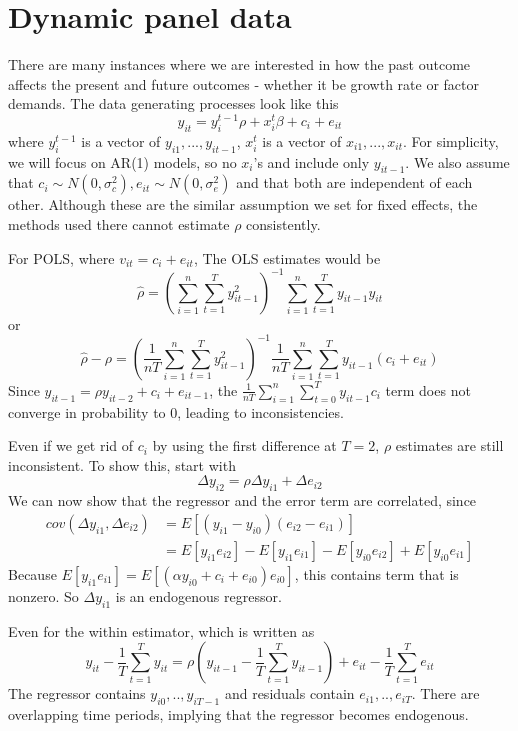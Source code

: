 \documentclass[12pt]{article}
\theoremstyle{definition}
\theoremstyle{property}
\theoremstyle{assumption}
\theoremstyle{example}
\theoremstyle{comment}
\begin{document}
\section{Dynamic panel data}
There are many instances where we are interested in how the past outcome affects the present and future outcomes - whether it be growth rate or factor demands. The data generating processes look like this
\[
y_{it}=y_{i}^{t-1}\rho+x_{i}^t\beta+c_i +e_{it}
\]
where $y_{i}^{t-1}$ is a vector of $y_{i1},...,y_{it-1}$, $x_{i}^t$ is a vector of $x_{i1},...,x_{it}$. For simplicity, we will focus on AR(1) models, so no $x_{i}$'s and include only $y_{it-1}$. We also assume that $c_i \sim N(0,\sigma_c^2), e_{it}\sim N(0,\sigma_e^2)$ and that both are independent of each other. Although these are the similar assumption we set for fixed effects, the methods used there cannot estimate $\rho$ consistently. 
\par
For POLS, where $v_{it}=c_i+e_{it}$, The OLS estimates would be
\[
\hat{\rho}=\left(\sum_{i=1}^n \sum_{t=1}^Ty_{it-1}^2 \right)^{-1}\sum_{i=1}^n \sum_{t=1}^Ty_{it-1}y_{it}
\]
or
\[
\hat{\rho}-\rho = \left(\frac{1}{nT}\sum_{i=1}^n \sum_{t=1}^Ty_{it-1}^2 \right)^{-1}\frac{1}{nT}\sum_{i=1}^n \sum_{t=1}^Ty_{it-1}(c_i + e_{it})
\]
Since $y_{it-1} = \rho y_{it-2}+c_i + e_{it-1}$,  the $\frac{1}{nT}\sum_{i=1}^n \sum_{t=0}^Ty_{it-1}c_i$ term does not converge in probability to 0, leading to inconsistencies. 
\par
Even if we get rid of $c_i$ by using the first difference at $T=2$, $\rho$ estimates are still inconsistent. To show this, start with
\[
\Delta y_{i2}=\rho\Delta y_{i1}+\Delta e_{i2}
\]
We can now show that the regressor and the error term are correlated, since
\begin{align*}
cov(\Delta y_{i1}, \Delta e_{i2})&=E[(y_{i1}-y_{i0})(e_{i2}-e_{i1})]\\
 &=E[y_{i1}e_{i2}]-E[y_{i1}e_{i1}]-E[y_{i0}e_{i2}]+E[y_{i0}e_{i1}]
\end{align*}
Because $E[y_{i1}e_{i1}]=E[(\alpha y_{i0}+c_i+e_{i0})e_{i0}]$, this contains term that is nonzero. So $\Delta y_{i1}$ is an endogenous regressor. 
\par
Even for the within estimator, which is written as
\[
y_{it}-\frac{1}{T}\sum_{t=1}^Ty_{it}=\rho\left(y_{it-1}-\frac{1}{T}\sum_{t=1}^Ty_{it-1}\right)+e_{it}-\frac{1}{T}\sum_{t=1}^Te_{it}
\]
The regressor contains $y_{i0},..,y_{iT-1}$ and residuals contain $e_{i1},..,e_{iT}$. There are overlapping time periods, implying that the regressor becomes endogenous.
\end{document}
